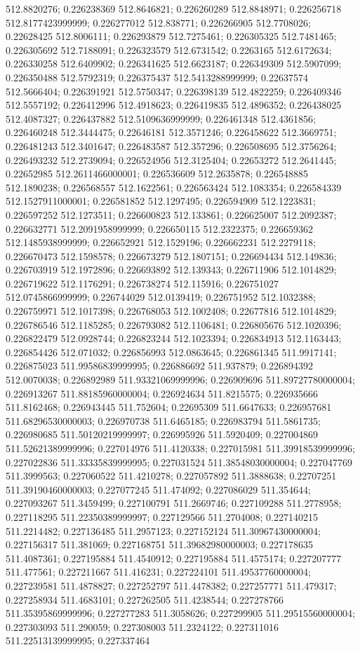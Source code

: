 512.8820276; 0.226238369 512.8646821; 0.226260289 512.8848971; 0.226256718 512.8177423999999; 0.226277012 512.838771; 0.226266905 512.7708026; 0.22628425 512.8006111; 0.226293879 512.7275461; 0.226305325 512.7481465; 0.226305692 512.7188091; 0.226323579 512.6731542; 0.2263165 512.6172634; 0.226330258 512.6409902; 0.226341625 512.6623187; 0.226349309 512.5907099; 0.226350488 512.5792319; 0.226375437 512.5413288999999; 0.22637574 512.5666404; 0.226391921 512.5750347; 0.226398139 512.4822259; 0.226409346 512.5557192; 0.226412996 512.4918623; 0.226419835 512.4896352; 0.226438025 512.4087327; 0.226437882 512.5109636999999; 0.226461348 512.4361856; 0.226460248 512.3444475; 0.22646181 512.3571246; 0.226458622 512.3669751; 0.226481243 512.3401647; 0.226483587 512.357296; 0.226508695 512.3756264; 0.226493232 512.2739094; 0.226524956 512.3125404; 0.22653272 512.2641445; 0.22652985 512.2611466000001; 0.226536609 512.2635878; 0.226548885 512.1890238; 0.226568557 512.1622561; 0.226563424 512.1083354; 0.226584339 512.1527911000001; 0.226581852 512.1297495; 0.226594909 512.1223831; 0.226597252 512.1273511; 0.226600823 512.133861; 0.226625007 512.2092387; 0.226632771 512.2091958999999; 0.226650115 512.2322375; 0.226659362 512.1485938999999; 0.226652921 512.1529196; 0.226662231 512.2279118; 0.226670473 512.1598578; 0.226673279 512.1807151; 0.226694434 512.149836; 0.226703919 512.1972896; 0.226693892 512.139343; 0.226711906 512.1014829; 0.226719622 512.1176291; 0.226738274 512.115916; 0.226751027 512.0745866999999; 0.226744029 512.0139419; 0.226751952 512.1032388; 0.226759971 512.1017398; 0.226768053 512.1002408; 0.22677816 512.1014829; 0.226786546 512.1185285; 0.226793082 512.1106481; 0.226805676 512.1020396; 0.226822479 512.0928744; 0.226823244 512.1023394; 0.226834913 512.1163443; 0.226854426 512.071032; 0.226856993 512.0863645; 0.226861345 511.9917141; 0.226875023 511.99586839999995; 0.226886692 511.937879; 0.226894392 512.0070038; 0.226892989 511.93321069999996; 0.226909696 511.89727780000004; 0.226913267 511.88185960000004; 0.226924634 511.8215575; 0.226935666 511.8162468; 0.226943445 511.752604; 0.22695309 511.6647633; 0.226957681 511.68296530000003; 0.226970738 511.6465185; 0.226983794 511.5861735; 0.226980685 511.50120219999997; 0.226995926 511.5920409; 0.227004869 511.52621389999996; 0.227014976 511.4120338; 0.227015981 511.39918539999996; 0.227022836 511.33335839999995; 0.227031524 511.38548030000004; 0.227047769 511.3999563; 0.227060522 511.4210278; 0.227057892 511.3888638; 0.22707251 511.39190460000003; 0.227077245 511.474092; 0.227086029 511.354644; 0.227093267 511.3459499; 0.227100791 511.2669746; 0.227109288 511.2778958; 0.227118295 511.22350389999997; 0.227129566 511.2704008; 0.227140215 511.2214482; 0.227136485 511.2957123; 0.227152124 511.30967430000004; 0.227156317 511.381069; 0.227168751 511.39682980000003; 0.227178635 511.4087361; 0.227195884 511.4540912; 0.227195884 511.4575174; 0.227207777 511.477561; 0.227211667 511.416231; 0.227224101 511.49537760000004; 0.227239581 511.4878827; 0.227252797 511.4478382; 0.227257771 511.479317; 0.227258934 511.4683101; 0.227262505 511.4238544; 0.227278766 511.35395869999996; 0.227277283 511.3058626; 0.227299905 511.29515560000004; 0.227303093 511.290059; 0.227308003 511.2324122; 0.227311016 511.22513139999995; 0.227337464 